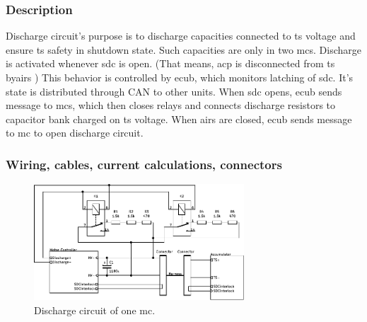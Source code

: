 \subsubsection{Description}

Discharge circuit's purpose is to discharge capacities connected to \gls{ts} voltage and ensure \gls{ts} safety in shutdown state. Such capacities are only in two \glspl{mc}.
Discharge is activated whenever \gls{sdc} is open. (That means, \gls{acp} is disconnected from \gls{ts} by\glspl{air} ) This behavior is controlled by \gls{ecub}, which monitors latching of \gls{sdc}. It's state is distributed through CAN to other units.
When \gls{sdc} opens, \gls{ecub} sends message to \glspl{mc}, which then closes relays and connects discharge resistors to capacitor bank charged on \gls{ts} voltage.
When \glspl{air} are closed, \gls{ecub} sends message to \gls{mc} to open discharge circuit.

\subsubsection{Wiring, cables, current calculations, connectors}

\begin{figure}[H]
	\centering
	\includegraphics[width=0.7\textwidth]{./img/MC_discharge.pdf}
	\caption{Discharge circuit of one \gls{mc}.}
	\label{fig:discharge-circuit}
\end{figure}


